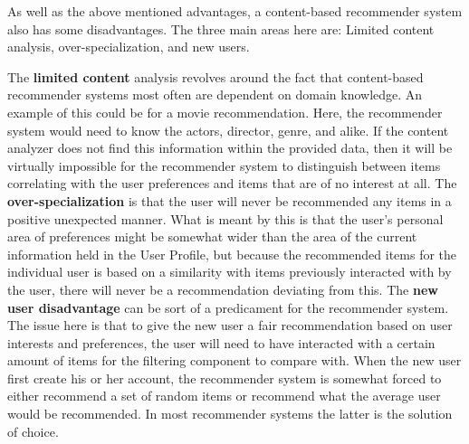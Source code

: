 As well as the above mentioned advantages, a content-based recommender system also has some disadvantages. The three main areas here are: Limited content analysis, over-specialization, and new users.\newline

The \textbf{limited content} analysis revolves around the fact that content-based recommender systems most often are dependent on domain knowledge. An example of this could be for a movie recommendation. Here, the recommender system would need to know the actors, director, genre, and alike. If the content analyzer does not find this information within the provided data, then it will be virtually impossible for the recommender system to distinguish between items correlating with the user preferences and items that are of no interest at all.\newline
The \textbf{over-specialization} is that the user will never be recommended any items in a positive unexpected manner. What is meant by this is that the user's personal area of preferences might be somewhat wider than the area of the current information held in the User Profile, but because the recommended items for the individual user is based on a similarity with items previously interacted with by the user, there will never be a recommendation deviating from this.\newline
The \textbf{new user disadvantage} can be sort of a predicament for the recommender system. The issue here is that to give the new user a fair recommendation based on user interests and preferences, the user will need to have interacted with a certain amount of items for the filtering component to compare with. When the new user first create his or her account, the recommender system is somewhat forced to either recommend a set of random items or recommend what the average user would be recommended. In most recommender systems the latter is the solution of choice.

